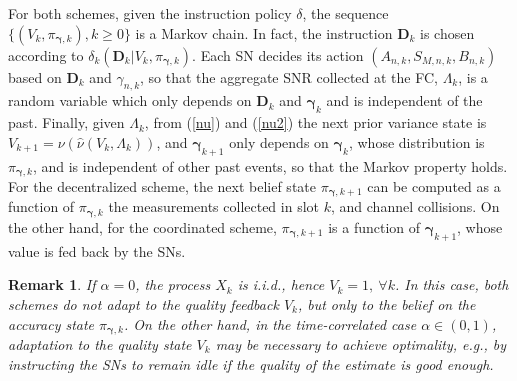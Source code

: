 \documentclass[10pt,twocolumn,twoside]{IEEEtran}
\theoremstyle{plain}
\newtheorem{remark}{Remark}
\begin{document}
For both schemes, given the instruction policy $\delta$,
the sequence $\{(V_k,\pi_{\boldsymbol{\gamma},k}),k{\geq}0\}$ is a Markov chain.
In fact, the instruction $\mathbf D_k$ is chosen according to
$\delta_k(\mathbf D_{k}|V_k,\pi_{\boldsymbol\gamma,k})$.
Each SN decides its action $(A_{n,k},S_{M,n,k},B_{n,k})$ based on
$\mathbf D_k$ and $\gamma_{n,k}$, so that the aggregate SNR collected at the FC, $\Lambda_k$, is a random variable
 which only depends on $\mathbf D_k$ and $\boldsymbol{\gamma}_{k}$ and is independent of the past.
Finally, given $\Lambda_k$, from (\ref{nu}) and (\ref{nu2}) the next prior variance state is
$V_{k+1}{=}\nu(\hat \nu(V_{k},\Lambda_k))$, and $\boldsymbol{\gamma}_{k+1}$
only depends on $\boldsymbol{\gamma}_{k}$, whose distribution is $\pi_{\boldsymbol{\gamma},k}$, and is independent of other past events, so that the Markov property holds.
For the decentralized scheme, the next belief state $\pi_{\boldsymbol{\gamma},k+1}$ can be computed as a function of $\pi_{\boldsymbol{\gamma},k}$
 the measurements collected in slot $k$, and channel collisions.
On the other hand, for the coordinated scheme, $\pi_{\boldsymbol{\gamma},k+1}$ is a function of $\boldsymbol{\gamma}_{k+1}$,
whose value is fed back by the SNs.
\vspace{-3mm}
\begin{remark}
\label{remiid}
If $\alpha{=}0$, the process $X_k$ is i.i.d., hence $V_k{=}1,\ \forall k$. In this case, both schemes do not adapt to the quality feedback $V_k$, but only to the belief on the accuracy state 
$\pi_{\boldsymbol{\gamma},k}$. On the other hand, in the time-correlated case $\alpha\in (0,1)$, adaptation to the quality state $V_k$ may be necessary to achieve optimality, \emph{e.g.}, by instructing the SNs to remain idle if the quality of the estimate is good enough.
\end{remark}
\vspace{-8mm}
\end{document}

